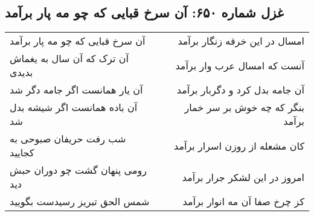 \begin{center}
\section*{غزل شماره ۶۵۰: آن سرخ قبایی که چو مه پار برآمد}
\label{sec:0650}
\begin{longtable}{l p{0.5cm} r}
آن سرخ قبایی که چو مه پار برآمد
&&
امسال در این خرقه زنگار برآمد
\\
آن ترک که آن سال به یغماش بدیدی
&&
آنست که امسال عرب وار برآمد
\\
آن یار همانست اگر جامه دگر شد
&&
آن جامه بدل کرد و دگربار برآمد
\\
آن باده همانست اگر شیشه بدل شد
&&
بنگر که چه خوش بر سر خمار برآمد
\\
شب رفت حریفان صبوحی به کجایید
&&
کان مشعله از روزن اسرار برآمد
\\
رومی پنهان گشت چو دوران حبش دید
&&
امروز در این لشکر جرار برآمد
\\
شمس الحق تبریز رسیدست بگویید
&&
کز چرخ صفا آن مه انوار برآمد
\\
\end{longtable}
\end{center}
